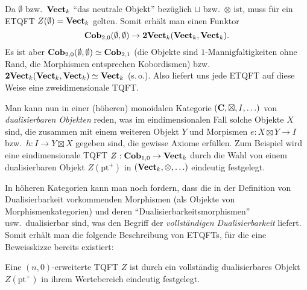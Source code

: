 Da $\emptyset$ bzw.\ $\mathbf{Vect}_k$ "`das neutrale Objekt"' bez\"uglich
$\sqcup$ bzw.\ $\otimes$ ist, muss f\"ur ein ETQFT $Z(\emptyset) =
\mathbf{Vect}_k$ gelten. Somit erh\"alt man einen Funktor
\begin{equation}
\mathbf{Cob}_{2, 0} (\emptyset, \emptyset) \to \mathbf{2Vect}_k
(\mathbf{Vect}_k, \mathbf{Vect}_k). \nonumber
\end{equation}
Es ist aber $\mathbf{Cob}_{2, 0} (\emptyset, \emptyset) \simeq
\mathbf{Cob}_{2, 1}$ (die Objekte sind $1$-Mannigfaltigkeiten ohne Rand,
die Morphismen entsprechen Kobordismen) bzw.\ $\mathbf{2Vect}_k
(\mathbf{Vect}_k, \mathbf{Vect}_k) \simeq \mathbf{Vect}_k$  (s.\,o.).
Also liefert uns jede ETQFT auf diese Weise eine zweidimensionale TQFT.

Man kann nun in einer (h\"oheren) monoidalen Kategorie $(\mathbf{C},
\boxtimes, I, \ldots)$ von \emph{dualisierbaren Objekten} reden, was im
eindimensionalen Fall solche Objekte $X$ sind, die zusammen mit einem weiteren
Objekt $Y$ und Morpismen $e: X \boxtimes Y \to I$ bzw.\ $h: I \to Y \boxtimes
X$ gegeben sind, die gewisse Axiome erf\"ullen. Zum Beispiel wird eine
eindimensionale TQFT $Z: \mathbf{Cob}_{1, 0} \to \mathbf{Vect}_k$ durch die
Wahl von einem dualisierbaren Objekt $Z(\mathrm{pt}^+)$ in $(\mathbf{Vect}_k,
\otimes, \ldots)$ eindeutig festgelegt.

In h\"oheren Kategorien kann man noch fordern, dass die in der Definition von
Dualisierbarkeit vorkommenden Morphismen (als Objekte von Morphismenkategorien)
und deren "`Dualisierbarkeitsmorphismen"' usw.\  dualisierbar sind, was den
Begriff der \emph{vollst\"andigen Dualisierbarkeit} liefert. Somit erh\"alt man
die folgende Beschreibung von ETQFTs, f\"ur die eine Beweisskizze bereits
existiert:

\begin{Sat}[Kobordismushypothese]
Eine $(n, 0)$-erweiterte TQFT $Z$ ist durch ein vollst\"andig dualisierbares
Objekt $Z(\mathrm{pt}^+)$ in ihrem Wertebereich eindeutig festgelegt.
\end{Sat}
